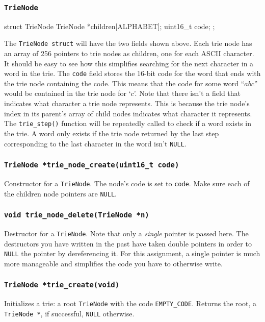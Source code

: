 \documentclass{article}
\begin{document}
\subsubsection{\texttt{TrieNode}}

\begin{codelisting}{}
struct TrieNode {
    TrieNode *children[ALPHABET];
    uint16_t code;
};
\end{codelisting}

The \texttt{TrieNode struct} will have the two fields shown above. Each trie
node has an array of 256 pointers to trie nodes as children, one for
each ASCII character. It should be easy to see how this simplifies
searching for the next character in a word in the trie. The
\texttt{code} field stores the 16-bit code for the word that ends with
the trie node containing the code. This means that the code for some
word ``$abc$'' would be contained in the trie node for `$c$'.  Note that
there isn't a field that indicates what character a trie node
represents. This is because the trie node's index in its parent's array
of child nodes indicates what character it represents. The
\texttt{trie\_step()} function will be repeatedly called to check if a
word exists in the trie. A word only exists if the trie node returned by
the last step corresponding to the last character in the word isn't
\texttt{NULL}.

\subsubsection{\texttt{TrieNode *trie\_node\_create(uint16\_t code)}}
Constructor for a \texttt{TrieNode}. The node's code is set to
\texttt{code}. Make sure each of the children node pointers are
\texttt{NULL}.

\subsubsection{\texttt{void trie\_node\_delete(TrieNode *n)}}
Destructor for a \texttt{TrieNode}. Note that only a \emph{single}
pointer is passed here. The destructors you have written in the past
have taken double pointers in order to \texttt{NULL} the pointer by
dereferencing it. For this assignment, a single pointer is much
more manageable and simplifies the code you have to otherwise write.

\subsubsection{\texttt{TrieNode *trie\_create(void)}}
Initializes a trie: a root \texttt{TrieNode} with the code
\texttt{EMPTY\_CODE}. Returns the root, a \texttt{TrieNode *}, if
successful, \texttt{NULL} otherwise.
\end{document}

